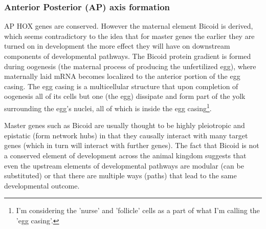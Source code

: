 \subsubsection{Anterior Posterior (AP) axis formation}
AP HOX genes are conserved.  However the maternal element Bicoid is derived, which seems contradictory to the idea that for master genes the earlier they are turned on in development the more effect they will have on downstream components of developmental pathways.  The Bicoid protein gradient is formed during oogenesis (the maternal process of producing the unfertilized egg), where maternally laid mRNA becomes localized to the anterior portion of the egg casing.  The egg casing is a multicellular structure that upon completion of oogenesis all of its cells but one (the egg) dissipate and form part of the yolk surrounding the egg's nuclei, all of which is inside the egg casing\footnote{I'm considering the 'nurse' and 'follicle' cells as a part of what I'm calling the 'egg casing'.}.

Master genes such as Bicoid are usually thought to be highly pleiotropic and epistatic (form network hubs) in that they causally interact with many target genes (which in turn will interact with further genes).  The fact that Bicoid is not a conserved element of development across the animal kingdom suggests that even the upstream elements of developmental pathways are modular (can be substituted) or that there are multiple ways (paths) that lead to the same developmental outcome.

